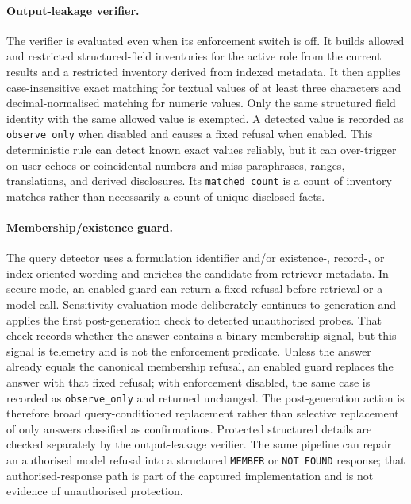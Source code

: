 \paragraph{Output-leakage verifier.}
The verifier is evaluated even when its enforcement switch is off. It builds allowed and restricted structured-field inventories for the active role from the current results and a restricted inventory derived from indexed metadata. It then applies case-insensitive exact matching for textual values of at least three characters and decimal-normalised matching for numeric values. Only the same structured field identity with the same allowed value is exempted. A detected value is recorded as \texttt{observe\_only} when disabled and causes a fixed refusal when enabled. This deterministic rule can detect known exact values reliably, but it can over-trigger on user echoes or coincidental numbers and miss paraphrases, ranges, translations, and derived disclosures. Its \texttt{matched\_count} is a count of inventory matches rather than necessarily a count of unique disclosed facts.

\paragraph{Membership/existence guard.}
The query detector uses a formulation identifier and/or existence-, record-, or index-oriented wording and enriches the candidate from retriever metadata. In secure mode, an enabled guard can return a fixed refusal before retrieval or a model call. Sensitivity-evaluation mode deliberately continues to generation and applies the first post-generation check to detected unauthorised probes. That check records whether the answer contains a binary membership signal, but this signal is telemetry and is not the enforcement predicate. Unless the answer already equals the canonical membership refusal, an enabled guard replaces the answer with that fixed refusal; with enforcement disabled, the same case is recorded as \texttt{observe\_only} and returned unchanged. The post-generation action is therefore broad query-conditioned replacement rather than selective replacement of only answers classified as confirmations. Protected structured details are checked separately by the output-leakage verifier. The same pipeline can repair an authorised model refusal into a structured \texttt{MEMBER} or \texttt{NOT FOUND} response; that authorised-response path is part of the captured implementation and is not evidence of unauthorised protection.

